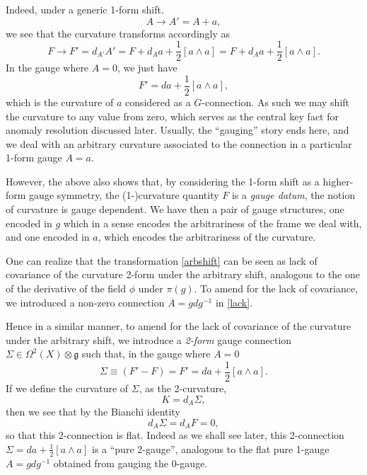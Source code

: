\documentclass[onecolumn]{article}
\theoremstyle{theorem}
\theoremstyle{remark}
\theoremstyle{example}
\theoremstyle{definition}
\numberwithin{equation}{section}
\begin{document}

Indeed, under a generic 1-form shift.   
\begin{equation}
A\rightarrow A'=A+a,    \nonumber
\end{equation}
we see that the curvature transforms accordingly as
\begin{equation}\label{arbshift}
    F \rightarrow F'=d_{A'}A'=F +d_Aa+\frac{1}{2}[a\wedge a] =F+ d_Aa+\frac{1}{2}[a\wedge a].
\end{equation}
{In} the gauge where $A=0$, we just have 
\begin{equation}
    F'=da+\frac{1}{2}[a\wedge a],\nonumber
\end{equation}
which is the curvature of $a$ considered as a $G$-connection. As such we may shift the curvature to any value from zero, which serves as the central key fact for anomaly resolution discussed later. Usually, the ``gauging'' story ends here, and we deal with an arbitrary curvature associated to the connection in a particular 1-form gauge $A=a$. 

However, the above also shows that, by considering the 1-form shift as a higher-form gauge symmetry, the (1-)curvature quantity $F$ is a {\it {gauge datum}}, the notion of curvature is gauge dependent. We have then a pair of gauge structures, one encoded in $g$ which in a sense encodes the arbitrariness of the frame we deal with, and one encoded in $a$, which encodes the arbitrariness of the curvature. 



One can realize that the transformation  \eqref{arbshift} can be seen as lack of covariance of the curvature 2-form under the arbitrary shift, analogous to the one of the derivative of the field $\phi$ under $\pi(g)$. To amend for the lack of covariance, we introduced a non-zero connection $A=gdg^{-1}$ in \eqref{lack}. 

Hence in a similar manner, to amend for the lack of covariance of the curvature under the arbitrary shift, we  introduce  a {\it {2-form}} gauge connection $\Sigma\in\Omega^2(X)\otimes\mathfrak{g}$ such that, in the gauge where $A=0$
\begin{equation}
    \Sigma\equiv (F'-F)= F'=da+\frac{1}{2}[a\wedge a] .\label{eq:2gau}
\end{equation}
{If} we define the curvature of $\Sigma$, as the 2-curvature, \begin{equation}
K=d_A\Sigma,     \nonumber
\end{equation}
then we see that by the Bianchi identity 
\begin{equation}
   d_{A}\Sigma= d_{A}F=0,  \nonumber
\end{equation}
so that this 2-connection is flat. Indeed as we shall see later, this 2-connection $\Sigma = da+\frac{1}{2}[a\wedge a]$ is a ``pure 2-gauge'', analogous to the flat pure 1-gauge $A=gdg^{-1}$ obtained from gauging the 0-gauge. 
\end{document}
